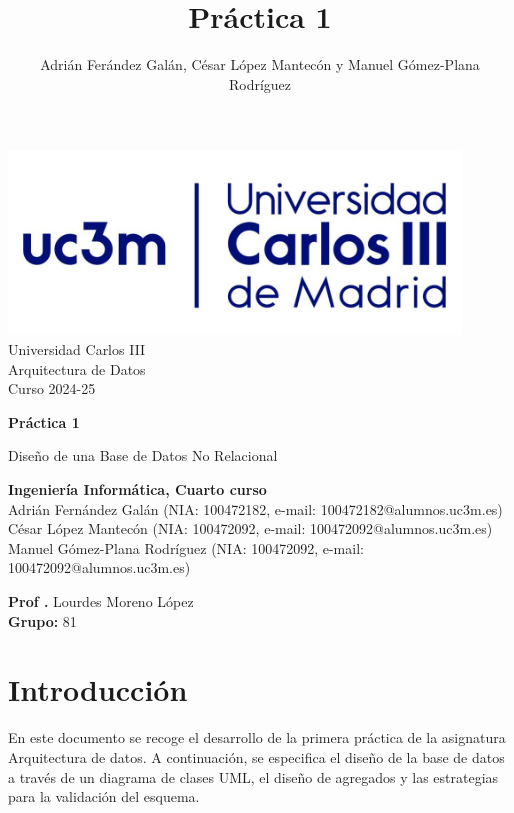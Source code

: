 \documentclass[]{article}
\title{Práctica 1}
\author{Adrián Ferández Galán, César López Mantecón y Manuel Gómez-Plana Rodríguez}
\begin{document}
\begin{titlepage}
    \centering
   \includegraphics[width=0.9\textwidth]{uc3m.jpg} 
    {\Huge Universidad Carlos III\\
    
     \Large Arquitectura de Datos\\
     \vspace{0.5cm}
     Curso 2024-25}
    \vspace{2cm}

    {\Huge \textbf{Práctica 1} \par}
    \vspace{0.5cm}
    {\Large Diseño de una Base de Datos No Relacional \par}
    \vspace{8cm}

   \textbf{Ingeniería Informática, Cuarto curso}\\
    \vspace{0.2cm} 
    Adrián Fernández Galán       (NIA: 100472182, e-mail: 100472182@alumnos.uc3m.es)\\
    César López Mantecón         (NIA: 100472092, e-mail: 100472092@alumnos.uc3m.es)\\
    Manuel Gómez-Plana Rodríguez (NIA: 100472092, e-mail: 100472092@alumnos.uc3m.es)
    \vspace{0.5cm}

   
    \textbf{Prof .} Lourdes Moreno López\\
    
    \textbf{Grupo: } 81   
    
\end{titlepage}
\newpage

\renewcommand{\contentsname}{\centering Índice}
\tableofcontents

\newpage

\section{Introducción}
\label{sec:introduccion}
En este documento se recoge el desarrollo de la primera práctica de la asignatura Arquitectura de datos. A continuación, se especifica el diseño de la base de datos a través de un diagrama de clases UML, el diseño de agregados y las estrategias para la validación del esquema.
\end{document}
